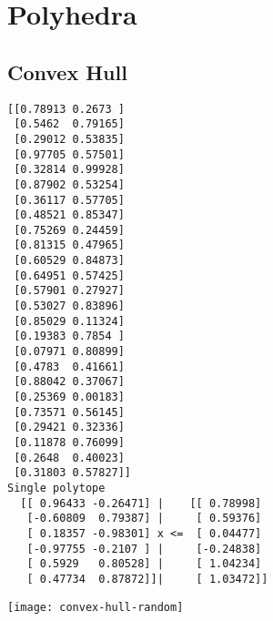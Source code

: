 \section{Polyhedra}

\subsection{Convex Hull}

\begin{verbatim}
[[0.78913 0.2673 ]
 [0.5462  0.79165]
 [0.29012 0.53835]
 [0.97705 0.57501]
 [0.32814 0.99928]
 [0.87902 0.53254]
 [0.36117 0.57705]
 [0.48521 0.85347]
 [0.75269 0.24459]
 [0.81315 0.47965]
 [0.60529 0.84873]
 [0.64951 0.57425]
 [0.57901 0.27927]
 [0.53027 0.83896]
 [0.85029 0.11324]
 [0.19383 0.7854 ]
 [0.07971 0.80899]
 [0.4783  0.41661]
 [0.88042 0.37067]
 [0.25369 0.00183]
 [0.73571 0.56145]
 [0.29421 0.32336]
 [0.11878 0.76099]
 [0.2648  0.40023]
 [0.31803 0.57827]]
Single polytope 
  [[ 0.96433 -0.26471] |    [[ 0.78998]
   [-0.60809  0.79387] |     [ 0.59376]
   [ 0.18357 -0.98301] x <=  [ 0.04477]
   [-0.97755 -0.2107 ] |     [-0.24838]
   [ 0.5929   0.80528] |     [ 1.04234]
   [ 0.47734  0.87872]]|     [ 1.03472]]
\end{verbatim}

\texttt{[image: convex-hull-random]}


